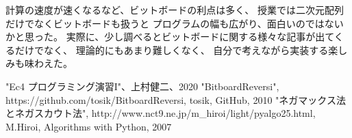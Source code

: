 \documentclass{jsarticle}
\begin{document}
    計算の速度が速くなるなど、ビットボードの利点は多く、
    授業では二次元配列だけでなくビットボードも扱うと
    プログラムの幅も広がり、面白いのではないかと思った。
    実際に、少し調べるとビットボードに関する様々な記事が出てくるだけでなく、
    理論的にもあまり難しくなく、
    自分で考えながら実装する楽しみも味わえた。

\begin{thebibliography}{99}
     "Ec4 プログラミング演習I"、上村健二、2020
     "BitboardReversi", https://github.com/tosik/BitboardReversi, tosik, GitHub, 2010
     "ネガマックス法とネガスカウト法", http://www.nct9.ne.jp/m\_hiroi/light/pyalgo25.html, M.Hiroi, Algorithms with Python, 2007
\end{thebibliography}
\end{document}

